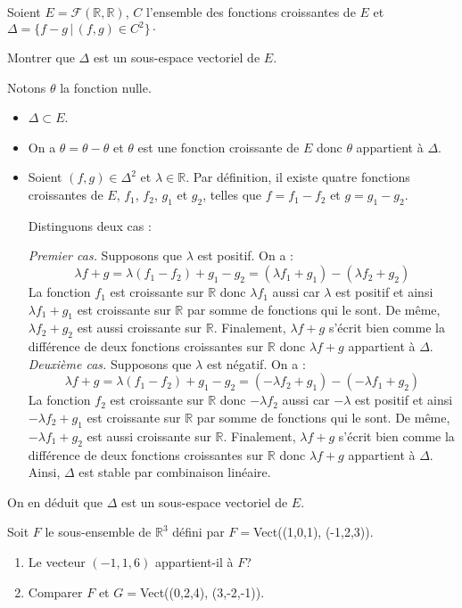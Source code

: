 \documentclass[a4paper,10pt]{report}
\begin{document}
\begin{Exercice}{} Soient $E = \mathcal{F}(\mathbb{R}, \mathbb{R})$, $C$ l'ensemble des fonctions croissantes de $E$ et $\Delta = \lbrace f-g \, \vert \, (f,g) \in C^2 \rbrace\cdot$

\noindent Montrer que $\Delta$ est un sous-espace vectoriel de $E$.
\end{Exercice}

\corr Notons $\theta$ la fonction nulle.

\begin{itemize}
\item $\Delta \subset E$.
\item On a $\theta = \theta - \theta$ et $\theta$ est une fonction croissante de $E$ donc $\theta$ appartient à $\Delta$.
\item Soient $(f,g) \in \Delta^2$ et $\lambda \in \mathbb{R}$. Par définition, il existe quatre fonctions croissantes de $E$, $f_1$, $f_2$, $g_1$ et $g_2$, telles que $f=f_1- f_2$ et $g= g_1-g_2$.

\medskip

\noindent Distinguons deux cas :

\noindent \textit{Premier cas.} Supposons que $\lambda$ est positif. On a :
$$ \lambda f+g = \lambda (f_1-f_2) + g_1- g_2 = (\lambda f_1 + g_1) - (\lambda f_2+g_2)$$
La fonction $f_1$ est croissante sur $\mathbb{R}$ donc $\lambda f_1$ aussi car $\lambda$ est positif et ainsi $\lambda f_1 + g_1$ est croissante sur $\mathbb{R}$ par somme de fonctions qui le sont. De même, $\lambda f_2+g_2$ est aussi croissante sur $\mathbb{R}$. Finalement, $\lambda f+g$ s'écrit bien comme la différence de deux fonctions croissantes sur $\mathbb{R}$ donc $\lambda f+g$ appartient à $\Delta$.
\noindent \textit{Deuxième cas.} Supposons que $\lambda$ est négatif. On a :
$$ \lambda f+g = \lambda (f_1-f_2) + g_1- g_2 = (-\lambda f_2 + g_1) - (-\lambda f_1+g_2)$$
La fonction $f_2$ est croissante sur $\mathbb{R}$ donc $-\lambda f_2$ aussi car $-\lambda$ est positif et ainsi $-\lambda f_2 + g_1$ est croissante sur $\mathbb{R}$ par somme de fonctions qui le sont. De même, $-\lambda f_1+g_2$ est aussi croissante sur $\mathbb{R}$. Finalement, $\lambda f+g$ s'écrit bien comme la différence de deux fonctions croissantes sur $\mathbb{R}$ donc $\lambda f+g$ appartient à $\Delta$.
Ainsi, $\Delta$ est stable par combinaison linéaire.
\end{itemize}
On en déduit que $\Delta$ est un sous-espace vectoriel de $E$.

\begin{Exercice}{} Soit $F$ le sous-ensemble de $\mathbb{R}^3$ défini par $F=$Vect((1,0,1), (-1,2,3)). 
\begin{enumerate}
\item Le vecteur $(-1,1,6)$ appartient-il à $F$?
\item Comparer $F$ et $G=$Vect((0,2,4), (3,-2,-1)). 
\end{enumerate}
\end{Exercice}
\end{document}
